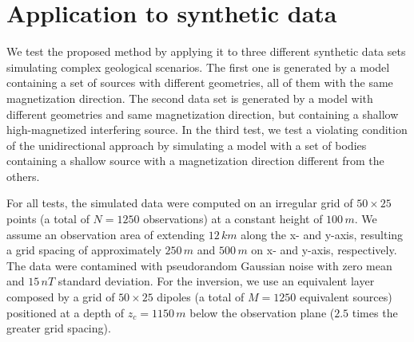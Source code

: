 \section{Application to synthetic data}
\label{sec:synt_tests}

We test the proposed method by applying it to three different synthetic data sets simulating complex geological scenarios. The first one is generated by a model containing a set of sources with different geometries, all of them with the same magnetization direction. The second data set is generated by a model with different geometries and same magnetization direction, but containing a shallow high-magnetized interfering source. In the third test, we test a violating condition of the unidirectional approach by simulating a model with a set of bodies containing a shallow source with a magnetization direction different from the others.

For all tests, the simulated data were computed on an irregular grid of $50 \times 25$ points (a total of $N = 1250$ observations) at a constant height of $100 \, m$.  We assume an observation area of extending $12 \, km$ along the x- and y-axis, resulting a grid spacing of approximately $250 \, m$ and $500 \, m$ on x- and y-axis, respectively. The data were contamined with pseudorandom Gaussian noise with zero mean and $15 \, nT$ standard deviation. For the inversion, we use an equivalent layer composed by a grid of $50 \times 25$ dipoles (a total of $M = 1250$ equivalent sources) positioned at a depth of $z_c = 1150 \, m$ below the observation plane ($2.5$ times the greater grid spacing).  
 



